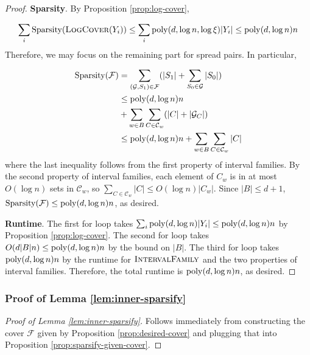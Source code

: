 \begin{proof}
\textbf{Sparsity}. By Proposition \ref{prop:log-cover},

$$\sum_i \text{Sparsity}(\textsc{LogCover}(Y_i)) \le \sum_i \mathrm{poly}(d,\log n,\log \xi) |Y_i|\le \mathrm{poly}(d,\log n) n$$
Therefore, we may focus on the remaining part for spread pairs. In particular,

\begin{align*}
    \text{Sparsity}(\mathcal F) &= \sum_{(\mathcal G,S_1)\in \mathcal F}(|S_1| + \sum_{S_0\in \mathcal G} |S_0|)\\
    &\le \mathrm{poly}(d,\log n) n\\
    &+ \sum_{w\in B}\sum_{C\in \mathcal C_w}(|C| + |\mathcal G_C|)\\
    &\le \mathrm{poly}(d,\log n) n + \sum_{w\in B}\sum_{C\in \mathcal C_w} |C|
\end{align*}
where the last inequality follows from the first property of interval families. By the second property of interval families, each element of $C_w$ is in at most $O(\log n)$ sets in $\mathcal C_w$, so $\sum_{C\in \mathcal C_w} |C|\le O(\log n) |C_w|$. Since $|B|\le d+1$, $\text{Sparsity}(\mathcal F)\le \mathrm{poly}(d,\log n) n$, as desired.

\textbf{Runtime}. The first for loop takes $\sum_i \mathrm{poly}(d,\log n) |Y_i|\le \mathrm{poly}(d,\log n) n$ by Proposition \ref{prop:log-cover}. The second for loop takes $O(d|B|n)\le \mathrm{poly}(d,\log n) n$ by the bound on $|B|$. The third for loop takes $\mathrm{poly}(d,\log n) n$ by the runtime for $\textsc{IntervalFamily}$ and the two properties of interval families. Therefore, the total runtime is $\mathrm{poly}(d,\log n) n$, as desired.

\end{proof}

\subsubsection{Proof of Lemma \ref{lem:inner-sparsify}}

\begin{proof}[Proof of Lemma \ref{lem:inner-sparsify}]
Follows immediately from constructing the cover $\mathcal F$ given by Proposition \ref{prop:desired-cover} and plugging that into Proposition \ref{prop:sparsify-given-cover}.
\end{proof}

